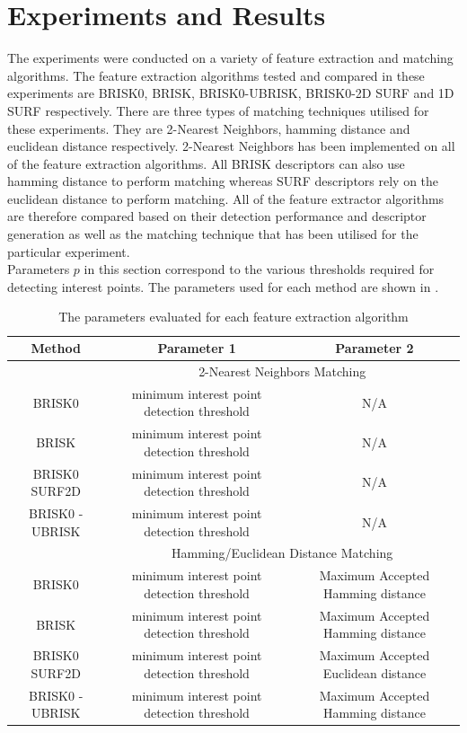 \documentclass{article}
\begin{document}
\section{Experiments and Results}
\label{sec:experimentsResults}
The experiments were conducted on a variety of feature extraction and matching algorithms. The feature extraction algorithms tested and compared in these experiments are BRISK0, BRISK, BRISK0-UBRISK, BRISK0-2D SURF and 1D SURF respectively. There are three types of matching techniques utilised for these experiments. They are 2-Nearest Neighbors, hamming distance and euclidean distance respectively. 2-Nearest Neighbors has been implemented on all of the feature extraction algorithms. All BRISK descriptors can also use hamming distance to perform matching whereas SURF descriptors rely on the euclidean distance to perform matching. All of the feature extractor algorithms are therefore compared based on their detection performance and descriptor generation as well as the matching technique that has been utilised for the particular experiment.\\

Parameters $p$ in this section correspond to the various thresholds required for detecting interest points. The parameters used for each method are shown in .\\

\begin{table}
\caption{The parameters evaluated for each feature extraction algorithm}
\begin{tabular}{|c|c|c|}
\hline 
Method & Parameter 1 & Parameter 2\tabularnewline
\hline 
 & \multicolumn{2}{c}{2-Nearest Neighbors Matching}\tabularnewline
\hline 
BRISK0 & minimum interest point detection threshold & N/A\tabularnewline
\hline 
BRISK & minimum interest point detection threshold & N/A\tabularnewline
\hline 
BRISK0 SURF2D & minimum interest point detection threshold & N/A\tabularnewline
\hline 
BRISK0 - UBRISK & minimum interest point detection threshold & N/A\tabularnewline
\hline 
 & \multicolumn{2}{c}{Hamming/Euclidean Distance Matching}\tabularnewline
\hline 
BRISK0 & minimum interest point detection threshold & Maximum Accepted Hamming distance\tabularnewline
\hline 
BRISK & minimum interest point detection threshold & Maximum Accepted Hamming distance\tabularnewline
\hline 
BRISK0 SURF2D & minimum interest point detection threshold & Maximum Accepted Euclidean distance\tabularnewline
\hline 
BRISK0 - UBRISK & minimum interest point detection threshold & Maximum Accepted Hamming distance\tabularnewline
\hline 
\end{tabular}
\label{tab:parameters}
\end{table}
\end{document}
